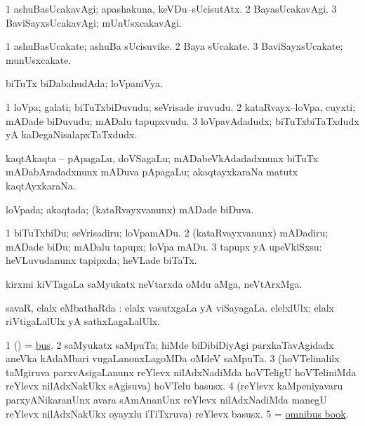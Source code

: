 \bentry
{}
\gl{\kirxvi}
\bmng
\bnum
\num{1} ashuBasUcakavAgi; apashakuna, keVDu--sUcisutAtx. 
\num{2} BayasUcakavAgi. 
\num{3} BaviSayxsUcakavAgi; mUnUsxcakavAgi. 
\enum
\emng
\eentry

\bentry
{}
\gl{\nA}
\bmng
\bnum
\num{1} ashuBasUcakate; ashuBa sUcisuvike. 
\num{2} Baya sUcakate. 
\num{3} BaviSayxsUcakate; munUsxcakate. 
\enum
\emng
\eentry

\bentry
{}
\gl{\gu}
\bmng
biTuTx biDabahudAda; loVpaniVya. 
\emng
\eentry

\bentry
{}
\gl{\nA}
\bmng
\bnum
\num{1} loVpa; galati; biTuTxbiDuvudu; seVrisade iruvudu. 
\num{2} kataRvayx--loVpa, cuyxti; mADade biDuvudu; mADalu tapupxvudu. 
\num{3} loVpavAdadudx; biTuTxbiTaTxdudx yA kaDegaNisalapxTaTxdudx. 
\enum
\emng

\noindent
\gl{\pagu}
\bmng
{} kaqtAkaqta -- pApagaLu, doVSagaLu; mADabeVkAdadadxnunx biTuTx mADabAradadxnunx mADuva pApagaLu; akaqtayxkaraNa matutx kaqtAyxkaraNa. 
\emng
\eentry

\bentry
{}
\gl{\gu}
\bmng
loVpada; akaqtada; (kataRvayxvanunx) mADade biDuva. 
\emng
\eentry

\bentry
{}
\gl{\sakirx}
\bmng
\bnum
\num{1} biTuTxbiDu; seVrisadiru; loVpamADu. 
\num{2} (kataRvayxvanunx) mADadiru; mADade biDu; mADalu tapupx; loVpa mADu. 
\num{3} tapupx yA upeVkiSxsu:  heVLuvudanunx tapipxda; heVLade biTaTx. 
\enum
\emng
\eentry

\bentry
{}
\gl{\nA}
\bmng
kirxmi kiVTagaLa saMyukatx neVtarxda oMdu aMga, neVtArxMga. 
\emng
\eentry

\bentry
{}
\gl{\sapUpa}
\bmng
savaR, elalx eMbathaRda \sapUpa: 
\banum
{} elalx vasutxgaLa yA viSayagaLa. 
 elelxlUlx; elalx riVtigaLalUlx yA sathxLagaLalUlx. 
\eanum
\emng
\eentry

\bentry
{}
\gl{\nA}
\bmng
\bnum
\num{1} (\aupa) = \hyperref{kandict_b.pdf}{B}{bus(1)}{bus}. 
\num{2} saMyukatx saMpuTa; hiMde biDibiDiyAgi parxkaTavAgidadx aneVka kAdaMbari \mo vugaLanonxLagoMDa oMdeV saMpuTa. 
\num{3} (hoVTelinalilx taMgiruva parxvAsigaLanunx reYlevx nilAdxNadiMda hoVTeligU hoVTeliniMda reYlevx nilAdxNakUkx sAgisuva) hoVTelu basusx. 
\num{4} (reYlevx kaMpeniyavaru parxyANikaranUnx avara sAmAnanUnx reYlevx nilAdxNadiMda manegU reYlevx nilAdxNakUkx oyayxlu iTiTxruva) reYlevx basusx. 
\num{5} = \hyperlink{omnibus book}{omnibus book}. 
\enum
\emng
\eentry


